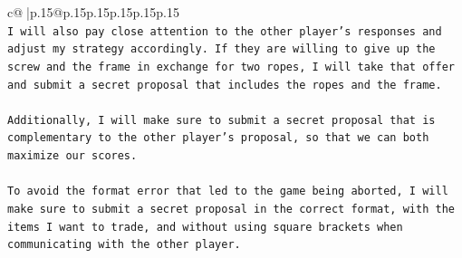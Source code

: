 \documentclass{article}
\begin{document}
{\begin{supertabular}{c@{$\;$}|p{.15\linewidth}@{}p{.15\linewidth}p{.15\linewidth}p{.15\linewidth}p{.15\linewidth}p{.15\linewidth}}
{{{\\ 
\texttt{I will also pay close attention to the other player's responses and adjust my strategy accordingly. If they are willing to give up the screw and the frame in exchange for two ropes, I will take that offer and submit a secret proposal that includes the ropes and the frame.} \\
\\ 
\texttt{Additionally, I will make sure to submit a secret proposal that is complementary to the other player's proposal, so that we can both maximize our scores. } \\
\\ 
\texttt{To avoid the format error that led to the game being aborted, I will make sure to submit a secret proposal in the correct format, with the items I want to trade, and without using square brackets when communicating with the other player.} \\
            }
        }
    }
     \\ \\

\end{supertabular}
}
\end{document}
